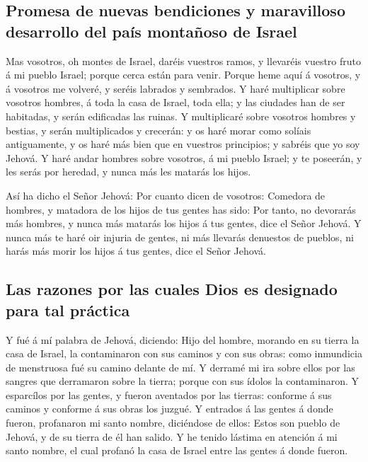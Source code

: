 \hypertarget{promesa-de-nuevas-bendiciones-y-maravilloso-desarrollo-del-pauxeds-montauxf1oso-de-israel}{%
\subsection{Promesa de nuevas bendiciones y maravilloso desarrollo del
país montañoso de
Israel}\label{promesa-de-nuevas-bendiciones-y-maravilloso-desarrollo-del-pauxeds-montauxf1oso-de-israel}}

 Mas vosotros, oh montes de Israel, daréis vuestros ramos,
y llevaréis vuestro fruto á mi pueblo Israel; porque cerca están para
venir.  Porque heme aquí á vosotros, y á vosotros me
volveré, y seréis labrados y sembrados.  Y haré
multiplicar sobre vosotros hombres, á toda la casa de Israel, toda ella;
y las ciudades han de ser habitadas, y serán edificadas las ruinas.
 Y multiplicaré sobre vosotros hombres y bestias, y serán
multiplicados y crecerán: y os haré morar como solíais antiguamente, y
os haré más bien que en vuestros principios; y sabréis que yo soy
Jehová.  Y haré andar hombres sobre vosotros, á mi pueblo
Israel; y te poseerán, y les serás por heredad, y nunca más les matarás
los hijos.

 Así ha dicho el Señor Jehová: Por cuanto dicen de
vosotros: Comedora de hombres, y matadora de los hijos de tus gentes has
sido:  Por tanto, no devorarás más hombres, y nunca más
matarás los hijos á tus gentes, dice el Señor Jehová.  Y
nunca más te haré oir injuria de gentes, ni más llevarás denuestos de
pueblos, ni harás más morir los hijos á tus gentes, dice el Señor
Jehová.

\hypertarget{las-razones-por-las-cuales-dios-es-designado-para-tal-pruxe1ctica}{%
\subsection{Las razones por las cuales Dios es designado para tal
práctica}\label{las-razones-por-las-cuales-dios-es-designado-para-tal-pruxe1ctica}}

 Y fué á mí palabra de Jehová, diciendo: 
Hijo del hombre, morando en su tierra la casa de Israel, la contaminaron
con sus caminos y con sus obras: como inmundicia de menstruosa fué su
camino delante de mí.  Y derramé mi ira sobre ellos por
las sangres que derramaron sobre la tierra; porque con sus ídolos la
contaminaron.  Y esparcílos por las gentes, y fueron
aventados por las tierras: conforme á sus caminos y conforme á sus obras
los juzgué.  Y entrados á las gentes á donde fueron,
profanaron mi santo nombre, diciéndose de ellos: Estos son pueblo de
Jehová, y de su tierra de él han salido.  Y he tenido
lástima en atención á mi santo nombre, el cual profanó la casa de Israel
entre las gentes á donde fueron.

